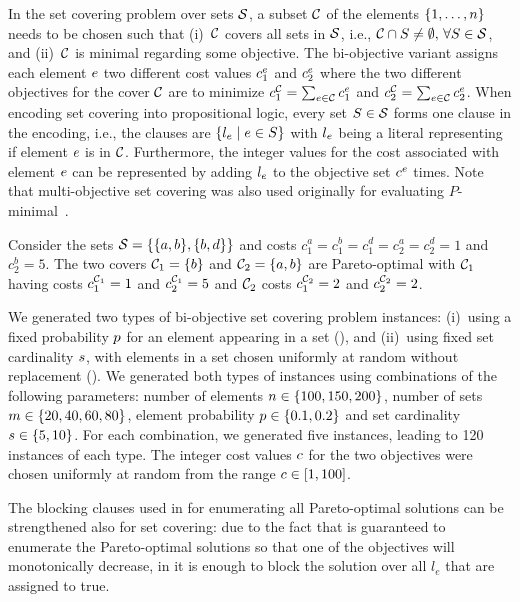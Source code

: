 In the set covering problem over sets $\mathcal{S}$, a subset $\mathcal{C}$ of the elements $\{1,\dots,n\}$ needs to be chosen such that (i)~$\mathcal{C}$ covers all sets in $\mathcal{S}$, i.e., $\mathcal{C}\cap S\neq\emptyset,\,\forall S\in\mathcal{S}$, and (ii)~$\mathcal{C}$ is minimal regarding some objective.
The bi-objective variant assigns each element $e$ two different cost values $c^e_1$ and $c^e_2$ where the two different objectives for the cover $\mathcal{C}$ are to minimize $c^{\mathcal{C}}_1 = \sum_{e\in\mathcal{C}}c^e_1$ and $c^{\mathcal{C}}_2 = \sum_{e\in\mathcal{C}}c^e_2$.
When encoding set covering into propositional logic, every set $S\in\mathcal{S}$ forms one clause in the encoding, i.e., the clauses are $\{l_e \mid e\in S\}$ with $l_e$ being a literal representing if element $e$ is in $\mathcal{C}$.
Furthermore, the integer values for the cost associated with element $e$ can be represented by adding $l_e$ to the objective set $c^e$ times.
Note that multi-objective set covering was also used originally for evaluating $P$-minimal~\autocite{DBLP:conf/cp/SohBTB17}.

\begin{example}
  Consider the sets $\mathcal{S} = \{ \{a, b\}, \{b, d\} \}$ and costs $c^a_1 = c^b_1 = c^d_1 = c^a_2 = c^d_2 = 1$ and $c^b_2 = 5$.
  The two covers $\mathcal{C}_1 = \{ b \}$ and $\mathcal{C}_2 = \{ a, b \}$ are Pareto-optimal with $\mathcal{C}_1$ having costs $c^{\mathcal{C}_1}_1 = 1$ and $c^{\mathcal{C}_1}_2 = 5$ and $\mathcal{C}_2$ costs $c^{\mathcal{C}_2}_1 = 2$ and $c^{\mathcal{C}_2}_2 = 2$.
\end{example}

We generated two types of  bi-objective set covering problem instances:
(i)~using a fixed probability $p$ for an element appearing in a set (\scep{}), and (ii)~using fixed set cardinality $s$, with elements in a set chosen uniformly at random without replacement (\scsc{}).
We generated both types of instances using combinations of the following parameters:
number of elements $n\in\{100,150,200\}$, number of sets $m\in\{20,40,60,80\}$, element probability $p\in\{0.1,0.2\}$ and set cardinality $s\in\{5,10\}$.
For each combination, we generated five instances, leading to 120 instances of each type.
The integer cost values $c$ for the two objectives were chosen uniformly at random from the range $c\in[1,100]$.

The blocking clauses used in \algname{} for enumerating all Pareto-optimal solutions can be strengthened also for set covering:
due to the fact that \algname{} is guaranteed to enumerate the Pareto-optimal solutions so that one of the objectives will monotonically decrease, in \algname{} it is enough to block the solution over all $l_e$ that are assigned to true.

